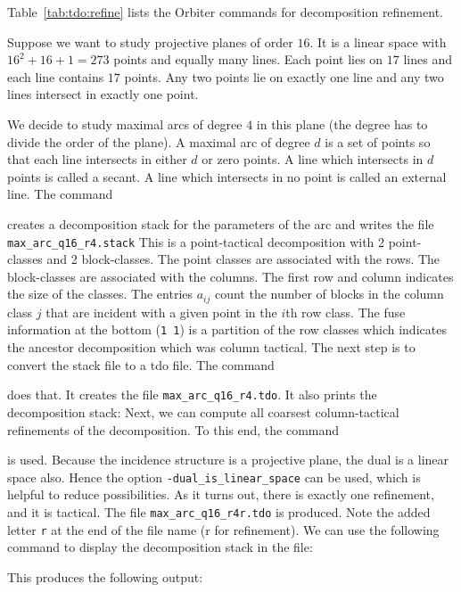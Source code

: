 Table~\ref{tab:tdo:refine} lists the Orbiter commands for decomposition refinement.

\bigskip

Suppose we want to study projective planes of order $16.$ 
It is a linear space with $16^2+16+1=273$ points and equally many lines. 
Each point lies on $17$ lines and each line contains $17$ points. 
Any two points lie on exactly one line and any two lines intersect in exactly one point.

\bigskip

We decide to 
study maximal arcs of degree $4$ in this plane (the degree has to divide the order of the plane).
A maximal arc of degree $d$ is a set of points so that each line intersects in either $d$ or zero points.
A line which intersects in $d$ points is called a secant.  
A line which intersects in no point is called an external line.
The command 


creates a decomposition stack for the parameters of the arc and writes the file \verb'max_arc_q16_r4.stack' 
This is a point-tactical decomposition with 2 point-classes and 2 block-classes. 
The point classes are associated with the rows. 
The block-classes are associated with the columns. 
The first row and column indicates the size of the classes.
The entries $a_{ij}$ count the number of blocks in the column class $j$ 
that are incident with a given point in the $i$th row  class.
The fuse information at the bottom (\verb'1 1') 
is a partition of the row classes which indicates the ancestor decomposition which was column tactical.
The next step is to convert the stack file to a tdo file.
The command


does that. 
It creates the file \verb'max_arc_q16_r4.tdo'. It also 
prints the decomposition stack:
Next, we can compute all coarsest column-tactical refinements of the decomposition. 
To this end, the command 


is used. 
Because the incidence structure is a projective plane, the dual is a linear space also. 
Hence the option \verb'-dual_is_linear_space' can be used, which is helpful to reduce possibilities. 
As it turns out, there is exactly one refinement, and it is tactical. 
The file \verb'max_arc_q16_r4r.tdo' is produced. 
Note the added letter \verb'r' at the end of the file name (r for refinement).
We can use the following command to display the decomposition stack in the file:


This produces the following output:

